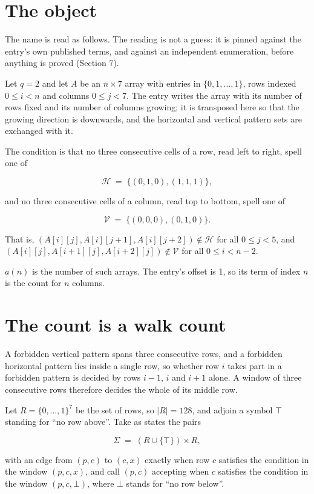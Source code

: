 \documentclass[11pt]{article}
\theoremstyle{definition}
\begin{document}
\section{The object}

The name is read as follows. The reading is not a guess: it is pinned against the entry's own published terms, and against an independent enumeration, before anything is proved (Section 7).

Let $q = 2$ and let $A$ be an $n \times 7$ array with entries in $\{0,1,\dots,1\}$, rows indexed $0 \le i < n$ and columns $0 \le j < 7$. The entry writes the array with its number of rows fixed and its number of columns growing; it is transposed here so that the growing direction is downwards, and the horizontal and vertical pattern sets are exchanged with it.

The condition is that no three consecutive cells of a row, read left to right, spell one of

\[\mathcal{H} \;=\; \{(0,1,0), (1,1,1)\},\]

and no three consecutive cells of a column, read top to bottom, spell one of

\[\mathcal{V} \;=\; \{(0,0,0), (0,1,0)\}.\]

That is, $(A[i][j],A[i][j{+}1],A[i][j{+}2]) \notin \mathcal{H}$ for all $0 \le j < 5$, and $(A[i][j],A[i{+}1][j],A[i{+}2][j]) \notin \mathcal{V}$ for all $0 \le i < n-2$.

$a(n)$ is the number of such arrays. The entry's offset is 1, so its term of index $n$ is the count for $n$ columns.

\section{The count is a walk count}

A forbidden vertical pattern spans three consecutive rows, and a forbidden horizontal pattern lies inside a single row, so whether row $i$ takes part in a forbidden pattern is decided by rows $i-1$, $i$ and $i+1$ alone. A window of three consecutive rows therefore decides the whole of its middle row.

Let $R = \{0,\dots,1\}^{7}$ be the set of rows, so $|R| = 128$, and adjoin a symbol $\top$ standing for ``no row above''. Take as states the pairs

\[\Sigma \;=\; (R \cup \{\top\}) \times R,\]

with an edge from $(p,c)$ to $(c,x)$ exactly when row $c$ satisfies the condition in the window $(p,c,x)$, and call $(p,c)$ accepting when $c$ satisfies the condition in the window $(p,c,\bot)$, where $\bot$ stands for ``no row below''.
\end{document}
